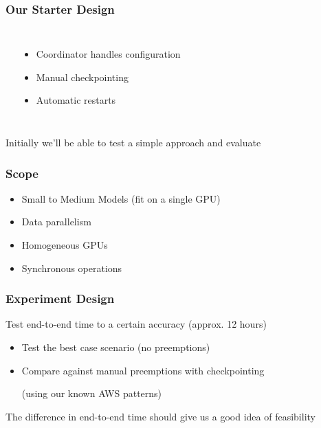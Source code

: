  \begin{frame}
    \frametitle{Our Starter Design}

    \begin{columns}
      \begin{flushright}
      \end{flushright}
      \begin{itemize}
        \item Coordinator handles configuration
        \item Manual checkpointing
        \item Automatic restarts
      \end{itemize}
    \end{columns}

    \vspace{3em}

    \hspace{7em} Initially we'll be able to test a simple approach and evaluate
  \end{frame}

  \begin{frame}
    \frametitle{Scope}

    \begin{itemize}
      \item Small to Medium Models (fit on a single GPU)
      \item Data parallelism
      \item Homogeneous GPUs
      \item Synchronous operations
    \end{itemize}
  \end{frame}

  \begin{frame}
    \frametitle{Experiment Design}

    Test end-to-end time to a certain accuracy (approx. 12 hours)

    \begin{itemize}
      \item Test the best case scenario (no preemptions)
      \item Compare against manual preemptions with checkpointing

            (using our known AWS patterns)
    \end{itemize}

    \vspace{2em}

    The difference in end-to-end time should give us a good idea of feasibility
  \end{frame}

